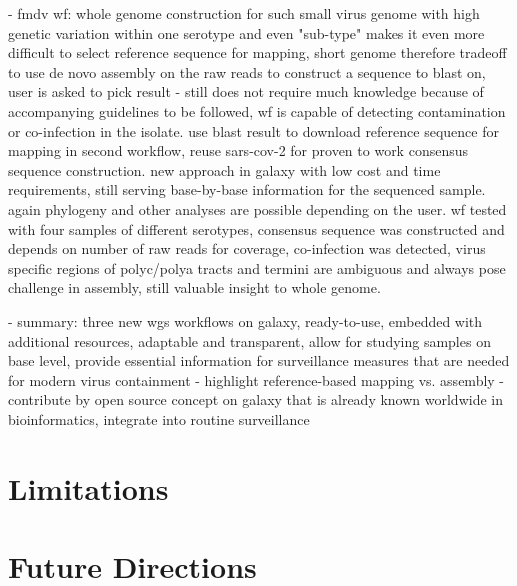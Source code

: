 - fmdv wf: whole genome construction for such small virus genome with high genetic variation within one serotype and even "sub-type" makes it even more difficult to select reference sequence for mapping, short genome therefore tradeoff to use de novo assembly on the raw reads to construct a sequence to blast on, user is asked to pick result - still does not require much knowledge because of accompanying guidelines to be followed, wf is capable of detecting contamination or co-infection in the isolate. use blast result to download reference sequence for mapping in second workflow, reuse sars-cov-2 for proven to work consensus sequence construction. new approach in galaxy with low cost and time requirements, still serving base-by-base information for the sequenced sample. again phylogeny and other analyses are possible depending on the user. wf tested with four samples of different serotypes, consensus sequence was constructed and depends on number of raw reads for coverage, co-infection was detected, virus specific regions of polyc/polya tracts and termini are ambiguous and always pose challenge in assembly, still valuable insight to whole genome.

- summary: three new wgs workflows on galaxy, ready-to-use, embedded with additional resources, adaptable and transparent, allow for studying samples on base level, provide essential information for surveillance measures that are needed for modern virus containment
- highlight reference-based mapping vs. assembly
- contribute by open source concept on galaxy that is already known worldwide in bioinformatics, integrate into routine surveillance



\section{Limitations}

\section{Future Directions}
